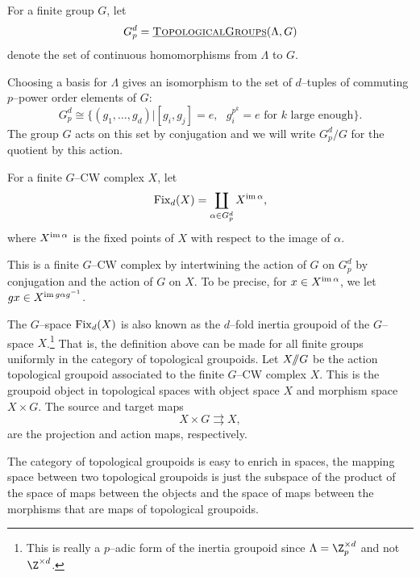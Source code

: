 
\begin{definition}
For a finite group \(G\), let
\[
G_{p}^{d} = \operatorname{\underline{\smash{\normalfont\textsc{TopologicalGroups}}}}(\Lambda,G)
\]
denote the set of continuous homomorphisms from \(\Lambda\) to \(G\).
\end{definition}

Choosing a basis for \(\Lambda\) gives an isomorphism to the set of \(d\)--tuples of commuting \(p\)--power order elements of \(G\):
\[
G_{p}^{d} \cong \{(g_1,\ldots, g_d)|[g_i,g_j] = e, \text{ } g_{i}^{p^k}=e \text{ for } k \text{ large enough}\}.
\]
The group \(G\) acts on this set by conjugation and we will write \(G_{p}^{d}/G\) for the quotient by this action.

\begin{definition} \label{fix}
For a finite \(G\)--CW complex \(X\), let
\[
\operatorname{Fix}_d(X) = \coprod_{\alpha \in G_{p}^{d}} X^{\operatorname{im} \alpha},
\]
where \(X^{\operatorname{im} \alpha}\) is the fixed points of \(X\) with respect to the image of \(\alpha\).
\end{definition}

This is a finite \(G\)--CW complex by intertwining the action of \(G\) on \(G_{p}^{d}\) by conjugation and the action of \(G\) on \(X\). To be precise, for \(x \in X^{\operatorname{im} \alpha}\), we let \(gx \in X^{\operatorname{im} g \alpha g^{-1}}\).

The \(G\)--space \(\operatorname{Fix}_d(X)\) is also known as the \(d\)--fold inertia groupoid of the \(G\)--space \(X\).\footnote{This is really a \(p\)--adic form of the inertia groupoid since \(\Lambda = \Z_{p}^{\times d}\) and not \(\Z^{\times d}\).} That is, the definition above can be made for all finite groups uniformly in the category of topological groupoids. Let \(X /\!\!/ G\) be the action topological groupoid associated to the finite \(G\)--CW complex \(X\). This is the groupoid object in topological spaces with object space \(X\) and morphism space \(X \times G\). The source and target maps
\[
X \times G \rightrightarrows X,
\]
are the projection and action maps, respectively.


The category of topological groupoids is easy to enrich in spaces, the mapping space between two topological groupoids is just the subspace of the product of the space of maps between the objects and the space of maps between the morphisms that are maps of topological groupoids. 

